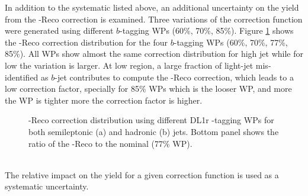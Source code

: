 In addition to the systematic listed above, an additional uncertainty on the yield from the \pT-Reco correction is examined. Three variations of the correction function were generated using different $b$-tagging WPs (60\%, 70\%, 85\%). Figure \ref{fig:HHyybb:Sys:Exp:PtReco} shows the \pT-Reco correction distribution for the four $b$-tagging WPs (60\%, 70\%, 77\%, 85\%). All WPs show almost the same correction distribution for high \pT jet while for low \pT the variation is larger. At low \pT region, a large fraction of light-jet mis-identified as $b$-jet contributes to compute the \pT-Reco correction, which leads to a low correction factor, specially for 85\% WPs which is the looser WP, and more the WP is tighter more the correction factor is higher.
\begin{figure}[htbp]
   \centering
   \quad
   \begin{tcolorbox}[colback=black!5!white,colframe=white!75!black]
   \caption{\pT-Reco correction distribution using different DL1r \bq-tagging WPs for both semileptonic (a) and hadronic (b) jets. Bottom panel shows the ratio of the \pT-Reco to the nominal (77\% WP). }
   \label{fig:HHyybb:Sys:Exp:PtReco}
   \end{tcolorbox}
   
\end{figure}
\\
The relative impact on the yield for a given correction function is used as a systematic uncertainty. \\
